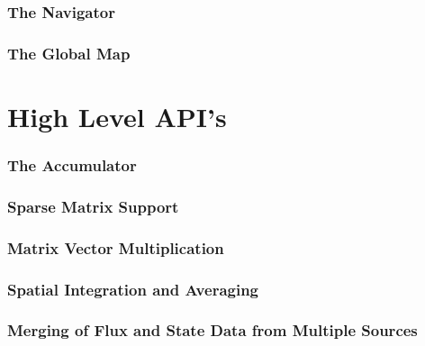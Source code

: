 \documentclass{article}
\begin{document}
\section{The Navigator}

\vspace*{\fill}
\newpage
%
\section{The Global Map}

\vspace*{\fill}
\newpage
%
%
\part{High Level API's}
\section{The Accumulator}

\vspace*{\fill}
\newpage

\vspace*{\fill}
\newpage

\vspace*{\fill}
\newpage
\section{Sparse Matrix Support}

\vspace*{\fill}
\newpage

\vspace*{\fill}
\newpage

\vspace*{\fill}
\newpage

\vspace*{\fill}
\newpage
%
\section{Matrix Vector Multiplication}

\vspace*{\fill}
\newpage
%
\section{Spatial Integration and Averaging}

\vspace*{\fill}
\newpage
%
\section{Merging of Flux and State Data from Multiple Sources}

\vspace*{\fill}
\newpage
%
\end{document}
